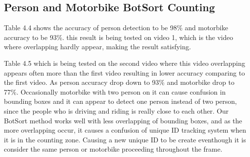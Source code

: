 \subsection{Person and Motorbike BotSort Counting}
\setlength{\parindent}{2.5em}  
Table 4.4 shows the accuracy of person detection to be 98\% and motorbike accuracy to be 93\%. this result is being tested on video 1, which is the video where overlapping hardly appear, making the result satisfying.


Table 4.5 which is being tested on the second video where this video overlapping appears often more than the first video resulting in lower accuracy comparing to the first video. As person accuracy drop down to 93\% and motorbike drop to 77\%. Occasionally motorbike with two person on it can cause confusion in bounding boxes and it can appear to detect one person instead of two person, since the people who is driving and riding is really close to each other. Our BotSort method works well with less overlapping of bounding boxes, and as the more overlapping occur, it causes a confusion of unique ID tracking system when it is in the counting zone. Causing a new unique ID to be create eventhough it is consider the same person or motorbike proceeding throughout the frame. 




